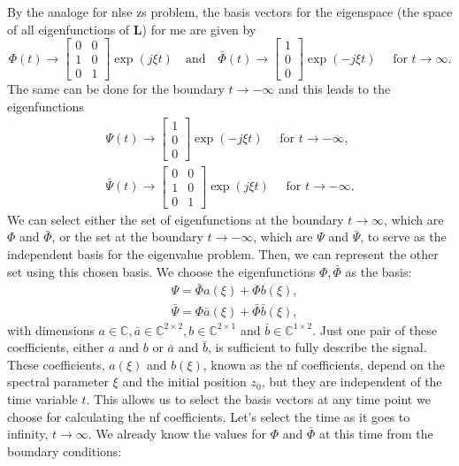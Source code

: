 By the analoge for \acrshort{nlse} \acrshort{zs} problem, the basis vectors for the eigenspace (the space of all eigenfunctions of $\mathbf{L}$) for \acrshort{me} are given by
$$
\Phi(t) \rightarrow\left[\begin{array}{ll}
0 & 0 \\
1 & 0 \\
0 & 1
\end{array}\right] \exp (j \xi t) \quad \text{and} \quad \bar{\Phi}(t) \rightarrow\left[\begin{array}{l}
1 \\
0 \\
0
\end{array}\right] \exp (-j \xi t) \quad \text { for } t \rightarrow \infty .
$$
The same can be done for the boundary $t \rightarrow-\infty$ and this leads to the eigenfunctions
$$
\begin{gathered}
\Psi(t) \rightarrow\left[\begin{array}{l}
1 \\
0 \\
0
\end{array}\right] \exp (-j \xi t) \quad \text { for } t \rightarrow-\infty, \\
\bar{\Psi}(t) \rightarrow\left[\begin{array}{ll}
0 & 0 \\
1 & 0 \\
0 & 1
\end{array}\right] \exp (j \xi t) \quad \text { for } t \rightarrow-\infty .
\end{gathered}
$$
We can select either the set of eigenfunctions at the boundary \( t \rightarrow \infty \), which are \( \Phi \) and \( \bar{\Phi} \), or the set at the boundary \( t \rightarrow -\infty \), which are \( \Psi \) and \( \bar{\Psi} \), to serve as the independent basis for the eigenvalue problem. Then, we can represent the other set using this chosen basis. We choose the eigenfunctions $\Phi, \bar{\Phi}$ as the basis:
\begin{equation}
\begin{aligned}
\label{CommonSolution}
& \Psi=\bar{\Phi} a(\xi)+\Phi b(\xi), \\
& \bar{\Psi}=\Phi \bar{a}(\xi)+\bar{\Phi} \bar{b}(\xi),
\end{aligned}
\end{equation}
with dimensions $a \in \mathbb{C}, \bar{a} \in \mathbb{C}^{2 \times 2}, b \in \mathbb{C}^{2 \times 1}$ and $\bar{b} \in \mathbb{C}^{1 \times 2}$. Just one pair of these coefficients, either \(a\) and \(b\) or \(\bar{a}\) and \(\bar{b}\), is sufficient to fully describe the signal. These coefficients, \(a(\xi)\) and \(b(\xi)\), known as the \acrlong{nf} coefficients, depend on the spectral parameter \(\xi\) and the initial position \(z_0\), but they are independent of the time variable \(t\). This allows us to select the basis vectors at any time point we choose for calculating the \acrlong{nf} coefficients. Let's select the time as it goes to infinity, \(t \rightarrow \infty\). We already know the values for \(\Phi\) and \(\bar{\Phi}\) at this time from the boundary conditions:
